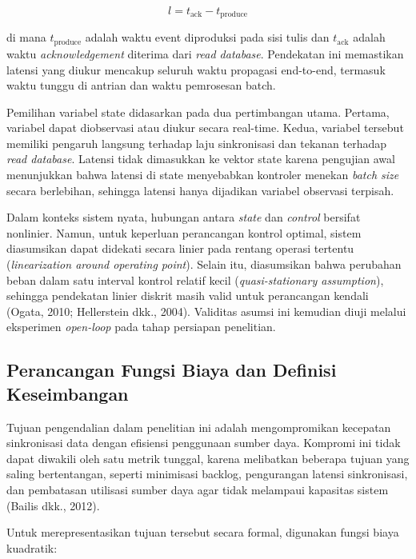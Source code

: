 \begin{equation}
l = t_{\text{ack}} - t_{\text{produce}}
\label{eq:latency-measurement}
\end{equation}

\noindent di mana $t_{\text{produce}}$ adalah waktu event diproduksi pada sisi tulis dan
$t_{\text{ack}}$ adalah waktu \emph{acknowledgement} diterima dari \emph{read database}.
Pendekatan ini memastikan latensi yang diukur mencakup seluruh waktu propagasi end-to-end,
termasuk waktu tunggu di antrian dan waktu pemrosesan batch.

Pemilihan variabel state didasarkan pada dua pertimbangan utama.
Pertama, variabel dapat diobservasi atau diukur secara real-time.
Kedua, variabel tersebut memiliki pengaruh langsung terhadap laju sinkronisasi dan tekanan
terhadap \emph{read database}.
Latensi tidak dimasukkan ke vektor state karena pengujian awal menunjukkan bahwa latensi di
state menyebabkan kontroler menekan \emph{batch size} secara berlebihan, sehingga latensi
hanya dijadikan variabel observasi terpisah.

Dalam konteks sistem nyata, hubungan antara \emph{state} dan \emph{control} bersifat nonlinier.
Namun, untuk keperluan perancangan kontrol optimal, sistem diasumsikan dapat didekati secara linier pada rentang operasi tertentu (\emph{linearization around operating point}).
Selain itu, diasumsikan bahwa perubahan beban dalam satu interval kontrol relatif kecil (\emph{quasi-stationary assumption}), sehingga pendekatan linier diskrit masih valid untuk perancangan kendali (Ogata, 2010; Hellerstein dkk., 2004).
Validitas asumsi ini kemudian diuji melalui eksperimen \emph{open-loop} pada tahap persiapan penelitian.

\subsection{Perancangan Fungsi Biaya dan Definisi Keseimbangan}

Tujuan pengendalian dalam penelitian ini adalah mengompromikan kecepatan sinkronisasi data dengan efisiensi penggunaan sumber daya.
Kompromi ini tidak dapat diwakili oleh satu metrik tunggal, karena melibatkan beberapa tujuan yang saling bertentangan, seperti minimisasi backlog, pengurangan latensi sinkronisasi, dan pembatasan utilisasi sumber daya agar tidak melampaui kapasitas sistem (Bailis dkk., 2012).

Untuk merepresentasikan tujuan tersebut secara formal, digunakan fungsi biaya kuadratik:


